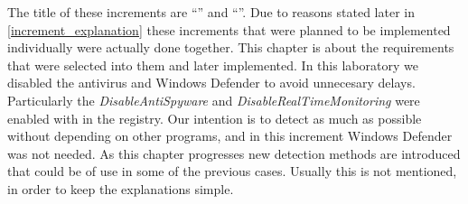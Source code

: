The title of these increments are ``\IncrementoUno'' and ``\IncrementoDos''. Due to reasons stated later in \ref{increment_explanation} these increments that were planned to be implemented individually were actually done together.
This chapter is about the requirements that were selected into them and later implemented.
\linej
\linej
In this laboratory we disabled the antivirus and Windows Defender to avoid unnecesary delays.
Particularly the \textit{DisableAntiSpyware} and \textit{DisableRealTimeMonitoring} were enabled with in the registry.
Our intention is to detect as much as possible without depending on other programs, and in this increment Windows Defender was not needed.
\linej
\linej
As this chapter progresses new detection methods are introduced that could be of use in some of the previous cases.
Usually this is not mentioned, in order to keep the explanations simple.

